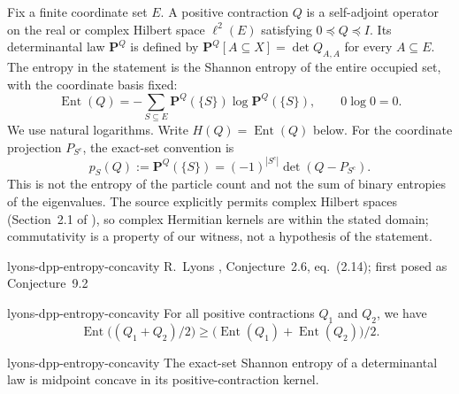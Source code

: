 
\begin{cxcredits}
\end{cxcredits}

\begin{cxcontext}
Fix a finite coordinate set $E$. A positive contraction $Q$ is a self-adjoint
operator on the real or complex Hilbert space $\ell^2(E)$ satisfying
$0\preceq Q\preceq I$. Its determinantal law $\mathbf P^Q$ is defined by
$\mathbf P^Q[A\subseteq X]=\det Q_{A,A}$ for every $A\subseteq E$.
The entropy in the statement is the Shannon entropy of the entire occupied
set, with the coordinate basis fixed:
\[
 \operatorname{Ent}(Q)
 =-\sum_{S\subseteq E}\mathbf P^Q(\{S\})\log\mathbf P^Q(\{S\}),
 \qquad 0\log0=0.
\]
We use natural logarithms. Write $H(Q)=\operatorname{Ent}(Q)$ below. For the
coordinate projection $P_{S^c}$, the exact-set convention is
\[
 p_S(Q):=\mathbf P^Q(\{S\})
 =(-1)^{|S^c|}\det(Q-P_{S^c}).
\]
This is not the entropy of the particle count and not the sum of binary
entropies of the eigenvalues. The source explicitly permits complex Hilbert
spaces (Section~2.1 of \cite{Lyons2014DPP}), so complex Hermitian kernels are
within the stated domain; commutativity is a property of our witness, not a
hypothesis of the statement.
\end{cxcontext}

\begin{cxsource}{lyons-dpp-entropy-concavity}
R.~Lyons \citeyearpar{Lyons2014DPP}, Conjecture~2.6, eq.~(2.14); first posed
as Conjecture~9.2 \citep{Lyons2003DPM}
\end{cxsource}

\begin{cxstatement}{lyons-dpp-entropy-concavity}
For all positive contractions $Q_1$ and $Q_2$, we have
\[
 \operatorname{Ent}\bigl((Q_1+Q_2)/2\bigr)
 \ge \bigl(\operatorname{Ent}(Q_1)+\operatorname{Ent}(Q_2)\bigr)/2.
\]
\end{cxstatement}

\begin{cxsummary}{lyons-dpp-entropy-concavity}
The exact-set Shannon entropy of a determinantal law is midpoint concave in its positive-contraction kernel.
\end{cxsummary}

